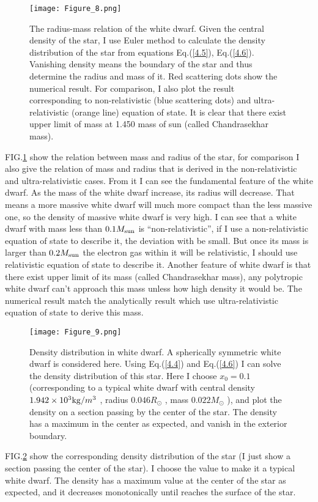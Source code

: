 \documentclass[reprint]{revtex4-1}
\begin{document}
\begin{figure}
	\centering   
	\texttt{[image: Figure\_8.png]}  
	\caption{The radius-mass relation of the white dwarf. Given the central density of the star, I use Euler method to calculate the density distribution of the star from equations Eq.(\ref{4.5}), Eq.(\ref{4.6}). Vanishing density means the boundary of the star and thus determine the radius and mass of it. Red scattering dots show the numerical result. For comparison, I also plot the result corresponding to non-relativistic (blue scattering dots) and ultra-relativistic (orange line) equation of state. It is clear that there exist upper limit of mass at 1.450 mass of sun (called Chandrasekhar mass).} 
	\label{fig:8} 
\end{figure}
FIG.\ref{fig:8} show the relation between mass and radius of the star, for comparison I also give the relation of mass and radius that is derived in the non-relativistic and ultra-relativistic cases. From it I can see the fundamental feature of the white dwarf. As the mass of the white dwarf increase, its radius will decrease. That means a more massive white dwarf will much more compact than the less massive one, so the density of massive white dwarf is very high. I can see that a white dwarf with mass less than $0.1{M_{{\mathop{\rm sun}\nolimits} }}$ is “non-relativistic”, if I use a non-relativistic equation of state to describe it, the deviation with be small. But once its mass is larger than $0.2{M_{{\mathop{\rm sun}\nolimits} }}$  the electron gas within it will be relativistic, I should use relativistic equation of state to describe it. Another feature of white dwarf is that there exist upper limit of its mass (called Chandrasekhar mass), any polytropic white dwarf can’t approach this mass unless how high density it would be. The numerical result match the analytically result which use ultra-relativistic equation of state to derive this mass.\par
\begin{figure}
	\centering   
	\texttt{[image: Figure\_9.png]}  
	\caption{Density distribution in white dwarf. A spherically symmetric white dwarf is considered here. Using Eq.(\ref{4.4}) and Eq.(\ref{4.6}) I can solve the density distribution of this star. Here I choose $x_0=0.1$ (corresponding to a typical white dwarf with central density $1.942 \times {10^3}{\mathop{\rm kg}\nolimits} /{m^3}$ , radius $0.046 R_{\odot}$ , mass $0.022M_{\odot}$ ), and plot the density on a section passing by the center of the star. The density has a maximum in the center as expected, and vanish in the exterior boundary.} 
	\label{fig:9} 
\end{figure}
FIG.\ref{fig:9} show the corresponding density distribution of the star (I just show a section passing the center of the star). I choose the value to make it a typical white dwarf. The density has a maximum value at the center of the star as expected, and it decreases monotonically until reaches the surface of the star.
\end{document}
